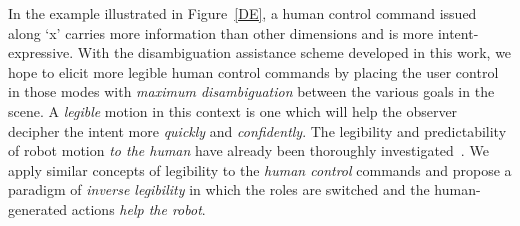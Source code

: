 \documentclass[conference]{IEEEtran}
\begin{document}

In the example illustrated in Figure~\ref{DE}, a human control command issued along `x' carries more information than other dimensions and is more intent-expressive. 
 With the disambiguation assistance scheme developed in this work, we hope to elicit more legible human control commands by placing the user control in those modes with \textit{maximum disambiguation} between the various goals in the scene. A \textit{legible} motion in this context is one which will help the observer decipher the intent more \textit{quickly} and \textit{confidently}. The legibility and predictability of robot motion \textit{to the human} have already been thoroughly
 investigated~\cite{dragan2013legibility}. We apply similar concepts of legibility to the \textit{human control} commands and propose a paradigm of \textit{inverse legibility} in which the roles are switched and the human-generated actions \textit{help the robot}.
 
\end{document}
